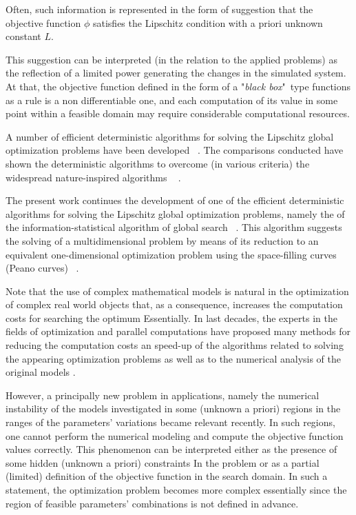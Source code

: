 \documentclass[runningheads]{llncs}
\begin{document}
Often, such information is represented in the form of suggestion that the objective function $\phi$ satisfies the Lipschitz condition with a priori unknown constant $L$.

This suggestion can be interpreted (in the relation to the applied problems) as the reflection of a limited power generating the changes in the simulated system. At that, the objective function defined in the form of a "\textit{black box}"\ type functions as a rule is a non differentiable one, and each computation of its value in some point within a feasible domain may require considerable computational resources.

A number of efficient deterministic algorithms for solving the Lipschitz global optimization problems have been developed ~\cite{Jones2009,Birect2020,Sergeyev2017}. The comparisons conducted have shown the deterministic algorithms to overcome (in various criteria) the widespread nature-inspired algorithms ~\cite{Liberti2005,Sergeyev2018,Sovrasov2019} .

The present work continues the development of one of the efficient deterministic algorithms for solving the Lipschitz global optimization problems, namely the of the information-statistical algorithm of global search ~\cite{indexMethod,strongin1978,Strongin2000}. This algorithm suggests the solving of a multidimensional problem by means of its reduction to an equivalent one-dimensional optimization problem using the space-filling curves (Peano curves) ~\cite{Sergeyev2013}. 

Note that the use of complex mathematical models is natural in the optimization of complex real world objects that, as a consequence, increases the computation costs for searching the optimum Essentially. In last decades, the experts in the fields of optimization and parallel computations have proposed many methods for reducing the computation costs an speed-up of the algorithms related to solving the appearing optimization problems \cite{Kvasov2013}  as well as to the numerical analysis of the original models \cite{Dongarra2022,Duwe2020}.

However, a principally new problem in applications, namely the numerical instability of the models investigated in some (unknown a priori) regions in the ranges of the parameters’ variations became relevant recently. In such regions, one cannot perform the numerical modeling and compute the objective function values correctly. This phenomenon can be interpreted either as the presence of some hidden (unknown a priori) constraints In the problem or as a partial (limited) definition of the objective function in the search domain. In such a statement, the optimization problem becomes more complex essentially since the region of feasible parameters’ combinations is not defined in advance.
\end{document}
